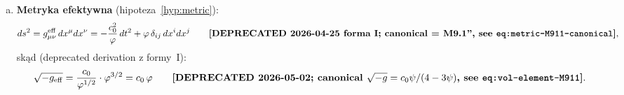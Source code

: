 \begin{hypothesis}
\begin{enumerate}[(a)]

  \item \textbf{Metryka efektywna} (hipoteza~\ref{hyp:metric}):
  \begin{equation}\label{eq:g-eff-unified}
    ds^2 = g_{\mu\nu}^{\mathrm{eff}}\,dx^\mu dx^\nu
    = -\frac{c_0^2}{\varphi}\,dt^2 + \varphi\,\delta_{ij}\,dx^i dx^j
    \qquad \textbf{[DEPRECATED 2026-04-25 forma I; canonical = M9.1'',
    see \texttt{eq:metric-M911-canonical}]},
  \end{equation}
  sk\k{a}d (deprecated derivation z formy~I):
  \begin{equation}\label{eq:sqrt-g-eff}
    \sqrt{-g_{\mathrm{eff}}}
    = \frac{c_0}{\varphi^{1/2}}\cdot\varphi^{3/2}
    = c_0\,\varphi
    \qquad \textbf{[DEPRECATED 2026-05-02; canonical
    $\sqrt{-g}=c_0\psi/(4-3\psi)$, see \texttt{eq:vol-element-M911}]}.
  \end{equation}
\end{enumerate}
\end{hypothesis}

